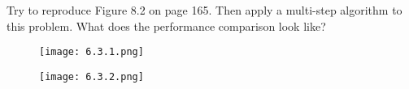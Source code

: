 
\begin{exercise}

Try to reproduce Figure 8.2 on page 165. Then apply a multi-step algorithm
to this problem. What does the performance comparison look like?

\end{exercise}


\begin{solution}


\begin{figure}[H]
    \centering
    \texttt{[image: 6.3.1.png]}
\end{figure}

    
\begin{figure}[H]
    \centering
    \texttt{[image: 6.3.2.png]}
\end{figure}


\end{solution}

